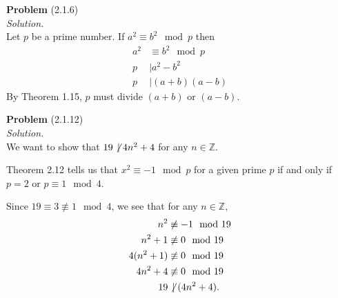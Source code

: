 \documentclass[12 pt]{amsart}
\begin{document}
\phantom{\quad} \vfill
\noindent
\textbf{Problem} (2.1.6) \\[4ex]
\emph{Solution.} \\[2ex]
  Let $p$ be a prime number.
  If $a^2 \equiv b^2 \mod p$ then
  \begin{align*}
    a^2 &\equiv b^2 \mod p \\
    p &\mid a^2 - b^2 \\
    p &\mid (a+b) (a-b)
  \end{align*}
  By Theorem 1.15, $p$ must divide $(a+b)$ or $(a-b)$.


\vfill
\newpage



\phantom{\quad} \vfill
\noindent
\textbf{Problem} (2.1.12) \\[4ex]
\emph{Solution.} \\[2ex]
  We want to show that $19 \not \, \mid 4n^2 + 4$ for any 
  $n \in \mathbb{Z}$.

  Theorem 2.12 tells us that $x^2 \equiv -1 \mod p$ for
  a given prime $p$ if and only if 
  $p = 2$ or $p \equiv 1 \mod 4$.

  Since $19 \equiv 3 \not \equiv 1 \mod 4$, we see that
  for any $n \in \mathbb{Z}$, 
  \begin{align*}
    n^2 &\not \equiv -1 \mod 19  \\
    n^2 + 1 &\not \equiv 0 \mod 19  \\
    4(n^2 + 1) &\not \equiv 0 \mod 19  \\
    4n^2 + 4 &\not \equiv 0 \mod 19  \\
    19 &\not \, \mid (4n^2 + 4).
  \end{align*}
  
\end{document}
